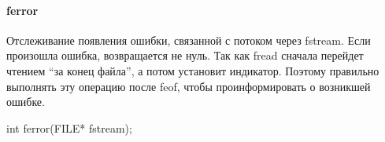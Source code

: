 \paragraph{ferror}
Отслеживание появления ошибки, связанной с потоком через fstream. Если произошла ошибка, возвращается не нуль. Так как fread сначала перейдет чтением ``за конец файла'', а потом установит индикатор. Поэтому правильно выполнять эту операцию после feof, чтобы проинформировать о возникшей ошибке.
\begin{ccode}
int ferror(FILE* fstream);
\end{ccode}

% 
